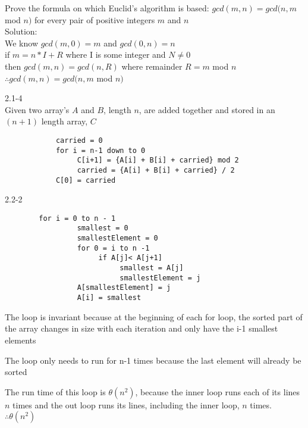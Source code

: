 \documentclass[12pt,largemargins]{homework}
\begin{document}
  \question
    \begin{arabicparts}

      \item
        Prove the formula on which Euclid's algorithm is based:
        $gcd(m,n)=gcd(n,m$ mod $ n)$ for every pair of positive integers $m$ and $n$\\
        Solution: \\
        We know $gcd(m,0)=m$ and $gcd(0,n)=n$\\
        if $m = n * I + R$ where I is some integer and $N \neq 0$\\
        then $gcd(m,n) = gcd(n,R)$ where remainder $R=m$ mod $n$ \\
        $\therefore gcd(m,n)=gcd(n,m$ mod $n)$
		
\newpage
    
      \item
        2.1-4\\ Given two array's $A$ and $B$, length $n$, are added together and stored in an $(n+1)$ length array, $C$
        \begin{verbatim}
			carried = 0 
			for i = n-1 down to 0 
			     C[i+1] = {A[i] + B[i] + carried} mod 2
			     carried = {A[i] + B[i] + carried} / 2 
			C[0] = carried
        \end{verbatim}
       		

		\item
		2.2-2
		\begin{alphaparts}
		\item
		\begin{verbatim}
		for i = 0 to n - 1
			     smallest = 0
			     smallestElement = 0
			     for 0 = i to n -1
			          if A[j]< A[j+1]
			               smallest = A[j]
			               smallestElement = j
			     A[smallestElement] = j
			     A[i] = smallest
		\end{verbatim}
		\item
		The loop is invariant because at the beginning of each for loop, the 
		sorted part of the array changes in size with each iteration and only have the i-1 smallest elements 
		\item
		The loop only needs to run for n-1 times because the last element will already be sorted
		\item
		The run time of this loop is $\theta (n^2)$, because the inner loop runs each of its lines $n$ times and the out loop runs its lines, including the inner loop, $n$ times. $\therefore \theta(n^2)$

		\end{alphaparts}
\end{arabicparts}
\end{document}
